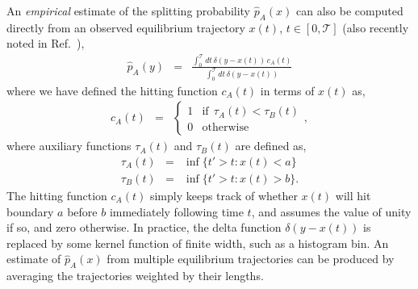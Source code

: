 \documentclass[aps,prl,twocolumn,superscriptaddress,floatfix]{revtex4-1}
\begin{document}
An \emph{empirical} estimate of the splitting probability $\hat{p}_A(x)$ can also be computed directly from an observed equilibrium trajectory $x(t)$, 
$t \in [0,\mathcal{T}]$ (also recently noted in Ref.~\cite{thirumalai:2011:prl:pfold}),
\begin{eqnarray}
\hat{p}_A(y) &=& \frac{\int_{0}^{\mathcal{T}} dt \, \delta(y - x(t)) \, c_A(t)}{\int_{0}^{\mathcal{T}} dt \, \delta(y - x(t))} \label{equation:empirical-splitting-probability}
\end{eqnarray}
where we have defined the hitting function $c_A(t)$ in terms of $x(t)$ as,
\begin{eqnarray}
c_A(t) &=& \begin{cases}
1 & \mathrm{if} \:\: \tau_A(t) < \tau_B(t) \\
0 & \mathrm{otherwise}
\end{cases} ,
\end{eqnarray}
where auxiliary functions $\tau_A(t)$ and $\tau_B(t)$ are defined as,
\begin{eqnarray}
\tau_A(t) &=& \inf \{ t' > t : x(t) < a \} \nonumber \\
\tau_B(t) &=& \inf \{ t' > t : x(t) > b \} .
\end{eqnarray}
\color{black}
The hitting function $c_A(t)$ simply keeps track of whether $x(t)$ will hit boundary $a$ before $b$ immediately following time $t$, and assumes the value of unity if so, and zero otherwise.
In practice, the delta function $\delta(y - x(t))$ is replaced by some kernel function of finite width, such as a histogram bin.
An estimate of $\hat{p}_A(x)$ from multiple equilibrium trajectories can be produced by averaging the trajectories weighted by their lengths.
\end{document}
